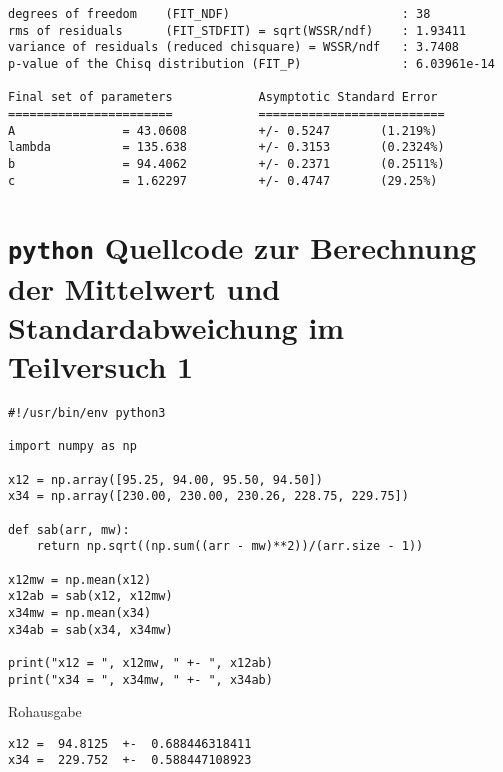     \begin{verbatim}
degrees of freedom    (FIT_NDF)                        : 38
rms of residuals      (FIT_STDFIT) = sqrt(WSSR/ndf)    : 1.93411
variance of residuals (reduced chisquare) = WSSR/ndf   : 3.7408
p-value of the Chisq distribution (FIT_P)              : 6.03961e-14

Final set of parameters            Asymptotic Standard Error
=======================            ==========================
A               = 43.0608          +/- 0.5247       (1.219%)
lambda          = 135.638          +/- 0.3153       (0.2324%)
b               = 94.4062          +/- 0.2371       (0.2511%)
c               = 1.62297          +/- 0.4747       (29.25%)
    \end{verbatim}
\newpage
\section{\texttt{python} Quellcode zur Berechnung der Mittelwert und Standardabweichung im Teilversuch 1}
    \label{appdx:pythontv1}
    \begin{verbatim}
#!/usr/bin/env python3

import numpy as np

x12 = np.array([95.25, 94.00, 95.50, 94.50])
x34 = np.array([230.00, 230.00, 230.26, 228.75, 229.75])

def sab(arr, mw):
    return np.sqrt((np.sum((arr - mw)**2))/(arr.size - 1))

x12mw = np.mean(x12)
x12ab = sab(x12, x12mw)
x34mw = np.mean(x34)
x34ab = sab(x34, x34mw)

print("x12 = ", x12mw, " +- ", x12ab)
print("x34 = ", x34mw, " +- ", x34ab)
    \end{verbatim}
    Rohausgabe
    \begin{verbatim}
x12 =  94.8125  +-  0.688446318411
x34 =  229.752  +-  0.588447108923
    \end{verbatim}


